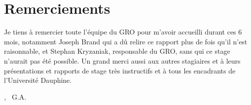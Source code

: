 
\cleardoublepage
{}
{}

\begingroup
\let\clearpage\relax
\let\cleardoublepage\relax
\let\cleardoublepage\relax

\chapter*{Remerciements}

Je tiens à remercier toute l'équipe du GRO pour m'avoir accueilli durant ces 6 mois, notamment Joseph Brand qui a dû relire ce rapport plus de fois qu'il n'est raisonnable, et Stephan Kryzaniak, responsable du GRO, sans qui ce stage n'aurait pas été possible.
Un grand merci aussi aux autres stagiaires et à leurs présentations et rapports de stage très instructifs et à tous les encadrants de l'Université Dauphine.

\bigskip
 
\noindent\textit{\mylocation, \MakeTextLowercase{\mytime}}
\hfill ~G.A.

\endgroup
